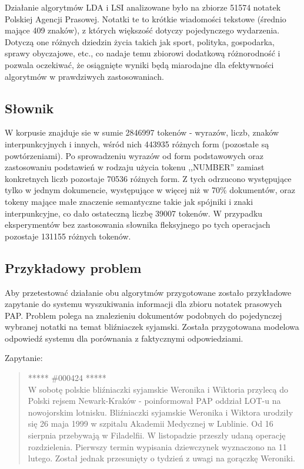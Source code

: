 \documentclass[11pt,a4paper]{article}
\begin{document}
Działanie algorytmów LDA i LSI analizowane było na zbiorze 51574 notatek
Polskiej Agencji Prasowej. Notatki te to krótkie wiadomości tekstowe (średnio
mające 409 znaków), z których większość dotyczy pojedynczego wydarzenia.
Dotyczą one różnych dziedzin życia takich jak sport, polityka, gospodarka,
sprawy obyczajowe, etc., co nadaje temu zbiorowi dodatkową różnorodność i
pozwala oczekiwać, że osiągnięte wyniki będą miarodajne dla efektywności
algorytmów w prawdziwych zastosowaniach.

\subsection{Słownik}

W korpusie znajduje sie w sumie 2846997 tokenów - wyrazów, liczb, znaków
interpunkcyjnych i innych, wśród nich 443935 różnych form (pozostałe są
powtórzeniami). Po sprowadzeniu wyrazów od form podstawowych oraz zastosowaniu
podstawień w rodzaju użycia tokenu ,,NUMBER'' zamiast konkretnych liczb
pozostaje 70536 różnych form. Z tych odrzucono występujące tylko w jednym
dokumencie, występujące w więcej niż w 70\% dokumentów, oraz tokeny mające małe
znaczenie semantyczne takie jak spójniki i znaki interpunkcyjne, co dało
ostateczną liczbę 39007 tokenów. W przypadku eksperymentów bez zastosowania
słownika fleksyjnego po tych operacjach pozostaje 131155 różnych tokenów.

\subsection{Przykładowy problem}
\label{sec:example}

Aby przetestować działanie obu algorytmów przygotowane zostało przykładowe
zapytanie do systemu wyszukiwania informacji dla zbioru notatek prasowych PAP.
Problem polega na znalezieniu dokumentów podobnych do pojedynczej wybranej
notatki na temat bliźniaczek syjamski. Została przygotowana modelowa odpowiedź
systemu dla porównania z faktycznymi odpowiedziami.

Zapytanie:

\begin{quote} ***** \#000424 *****\\ W sobotę polskie bliźniaczki syjamskie
Weronika i Wiktoria przylecą do Polski rejsem Newark-Kraków - poinformował PAP
oddział LOT-u na nowojorskim lotnisku.  Bliźniaczki syjamskie Weronika i
Wiktora urodziły się 26 maja 1999 w szpitalu Akademii Medycznej w Lublinie. Od
16 sierpnia przebywają w Filadelfii. W listopadzie przeszły udaną operację
rozdzielenia. Pierwszy termin wypisania dziewczynek wyznaczono na 11 lutego.
Został jednak przesunięty o tydzień z uwagi na gorączkę Weroniki.  \end{quote}
\end{document}

